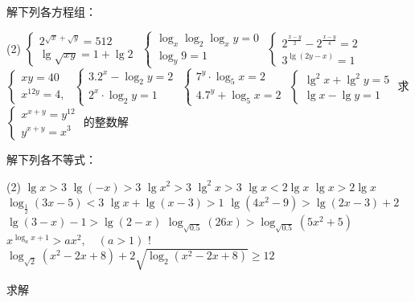 \begin{Exercise}
\begin{question}
\begin{tasks}
  \end{tasks}
  \item 解下列各方程组：
  \begin{tasks}(2)
    \task  $\begin{cases}2^{\sqrt{{x}}+\sqrt{y}}=512 \\ \lg \sqrt{x y}=1+\lg 2\end{cases}$
    \task  $\begin{cases}\log _{x} \log _{2} \log _{x} y=0 \\ \log _{y} 9=1\end{cases}$
    \task  $\begin{cases}2^{\tfrac{x-y}{2}}-2^{\tfrac{x-y}{4}}=2 \\ 3^{\lg(2 y-x)}=1\end{cases}$
    \task  $\begin{cases}x y=40 \\ x^{12 y}=4,\end{cases}$
    \task  $\begin{cases}3.2^{x}-\log _{2} y=2 \\ 2^{x} \cdot \log _{2} y=1\end{cases}$
    \task  $\begin{cases}7^{y} \cdot \log _{5} x=2 \\ 4.7^{y}+\log _{5} x=2\end{cases}$
    \task  $\begin{cases}\lg^2x+\lg^2y=5\\ \lg x-\lg y=1\end{cases}$
    \task 求 $\begin{cases} x^{x+y}=y^{12}\\ y^{x+y}=x^3 \end{cases}$ 的整数解
  \end{tasks}
  \item 解下列各不等式：
  \begin{tasks}(2)
    \task  $\lg x>3$
    \task  $\lg (-x)>3$
    \task  $\lg x^2>3$
    \task  $\lg^2 x>3$
    \task  $\lg x<2\lg x$
    \task  $\lg x>2\lg x$
    \task  $\log_{\tfrac{1}{2}}(3x-5)<3$
    \task  $\lg x+\lg (x-3)>1$
    \task  $\lg (4x^2-9)>\lg (2x-3)+2$
    \task  $\lg (3-x)-1>\lg (2-x)$    
    \task  $\log_{\sqrt{0.5}}(26x)>\log_{\sqrt{0.5}}(5x^2+5)$
    \task  $x^{\log_a x+1}>ax^2,\quad (a>1)$
    \task! $\log_{\sqrt{2}}(x^2-2x+8)+2\sqrt{\log_2(x^2-2x+8)}\geqslant 12$
  \end{tasks}
  \item 求解
  \begin{tasks}

\end{tasks}
\end{question}
\end{Exercise}

